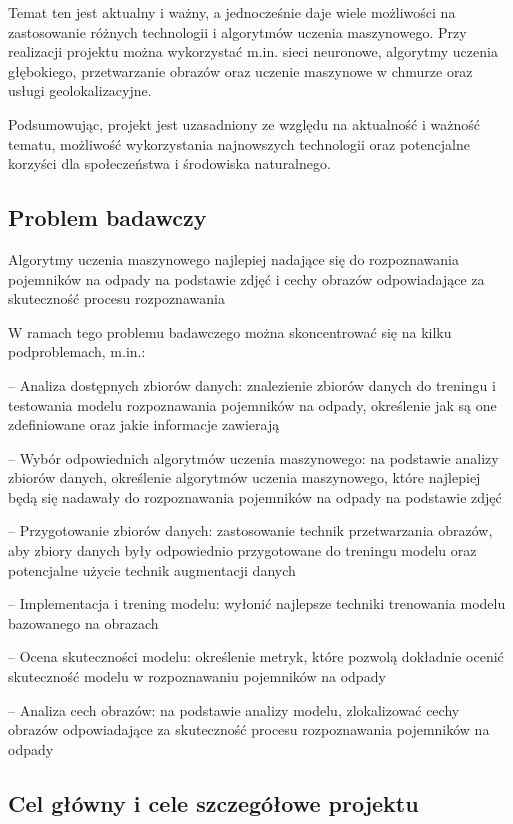 \documentclass[12pt,oneside]{book}
\begin{document}
Temat ten jest aktualny i ważny, a jednocześnie daje wiele możliwości na zastosowanie różnych technologii i algorytmów uczenia maszynowego. Przy realizacji projektu można wykorzystać m.in. sieci neuronowe, algorytmy uczenia głębokiego, przetwarzanie obrazów oraz uczenie maszynowe w chmurze oraz usługi geolokalizacyjne.

Podsumowując, projekt \topic  jest uzasadniony ze względu na aktualność i ważność tematu, możliwość wykorzystania najnowszych technologii oraz potencjalne korzyści dla społeczeństwa i środowiska naturalnego.

\subsection{Problem badawczy}
Algorytmy uczenia maszynowego najlepiej nadające się do rozpoznawania pojemników na odpady na podstawie zdjęć i cechy obrazów odpowiadające za skuteczność procesu rozpoznawania



W ramach tego problemu badawczego można skoncentrować się na kilku podproblemach, m.in.:

    -- Analiza dostępnych zbiorów danych: znalezienie zbiorów danych do treningu i testowania modelu rozpoznawania pojemników na odpady, określenie jak są one zdefiniowane oraz jakie informacje zawierają

    -- Wybór odpowiednich algorytmów uczenia maszynowego: na podstawie analizy zbiorów danych, określenie algorytmów uczenia maszynowego, które najlepiej będą się nadawały do rozpoznawania pojemników na odpady na podstawie zdjęć

    -- Przygotowanie zbiorów danych: zastosowanie technik przetwarzania obrazów, aby zbiory danych były odpowiednio przygotowane do treningu modelu oraz potencjalne użycie technik augmentacji danych

    -- Implementacja i trening modelu: wyłonić najlepsze techniki trenowania modelu bazowanego na obrazach

    -- Ocena skuteczności modelu: określenie metryk, które pozwolą dokładnie ocenić skuteczność modelu w rozpoznawaniu pojemników na odpady

    -- Analiza cech obrazów: na podstawie analizy modelu, zlokalizować cechy obrazów odpowiadające za skuteczność procesu rozpoznawania pojemników na odpady

\subsection{Cel główny i cele szczegółowe projektu}
\end{document}

